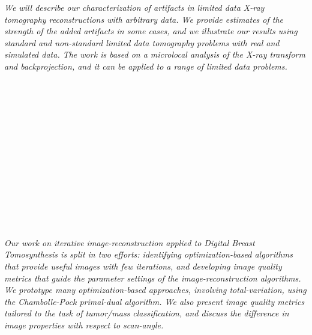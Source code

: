 \begin{multicols}{2}
\\ 
        \\
        \\\\
\\
      \textit{We will describe our characterization of artifacts in limited data X-ray tomography reconstructions with arbitrary data.  We provide estimates of the strength of the added artifacts in some cases, and we illustrate our results using standard and non-standard limited data tomography problems with real and simulated data. The work is based on a microlocal analysis of the X-ray transform and backprojection, and it can be applied to a range of  limited data problems. }\\
\\ 
        \\
        \\\\
        \\
        \\\\
        \\
        \\\\
        \\
        \\\\
\\
      \textit{Our work on iterative image-reconstruction applied to Digital Breast Tomosynthesis is split in two efforts:  identifying optimization-based algorithms that provide useful images with few iterations, and developing image quality metrics that guide the parameter settings of the image-reconstruction algorithms. We prototype many optimization-based approaches, involving total-variation, using the Chambolle-Pock primal-dual algorithm. We also present image quality metrics tailored to the task of tumor/mass classification, and discuss the difference in image properties with respect to scan-angle.}\\
\\ 
        \\
        \\\\
        \\

\end{multicols}
